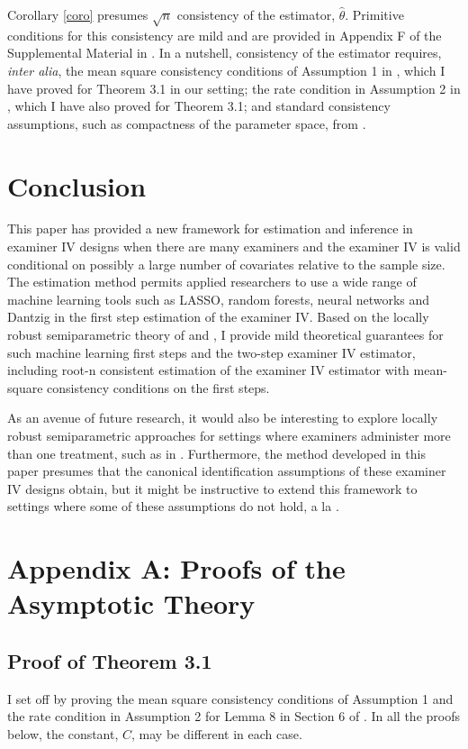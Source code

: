 Corollary \ref{coro} presumes $\sqrt{n}$ consistency of the estimator, $\hat{\theta}$.  Primitive conditions for this consistency are mild and are provided in Appendix F of the Supplemental Material in \citet{chernozhukov2022locally}. In a nutshell, consistency of the estimator requires, \textit{inter alia}, the mean square consistency conditions of Assumption 1 in \citet{chernozhukov2022locally}, which I have proved for Theorem 3.1 in our setting; the rate condition in Assumption 2 in \citet{chernozhukov2022locally}, which I have also proved for Theorem 3.1; and standard consistency assumptions, such as compactness of the parameter space, from \citet{NEWEY19942111}. 

\section{Conclusion}
This paper has provided a new framework for estimation and inference in examiner IV designs when there are many examiners and the examiner IV is valid conditional on possibly a large number of covariates relative to the sample size. The estimation method permits applied researchers to use a wide range of machine learning tools such as LASSO, random forests, neural networks and Dantzig in the first step estimation of the examiner IV. Based on the locally robust semiparametric theory of \citet{chernozhukov2022locally} and \citet{ichimura2022influence}, I provide mild theoretical guarantees for such machine learning first steps and the two-step examiner IV estimator, including root-n consistent estimation of the examiner IV estimator with mean-square consistency conditions on the first steps. 

As an avenue of future research, it would also be interesting to explore locally robust semiparametric approaches for settings where examiners administer more than one treatment, such as in \citet{kamat2023identification}. Furthermore, the method developed in this paper presumes that the canonical identification assumptions of these examiner IV designs obtain, but it might be instructive to extend this framework to settings where some of these assumptions do not hold, a la \citet{frandsen2023judging}. 

\appendix
\section{Appendix A: Proofs of the Asymptotic Theory}
\subsection{Proof of Theorem 3.1}
I set off by proving the mean square consistency conditions of Assumption 1 and the rate condition in Assumption 2 for Lemma 8 in Section 6 of \citet{chernozhukov2022locally}. In all the proofs below, the constant, $C$, may be different in each case. 

